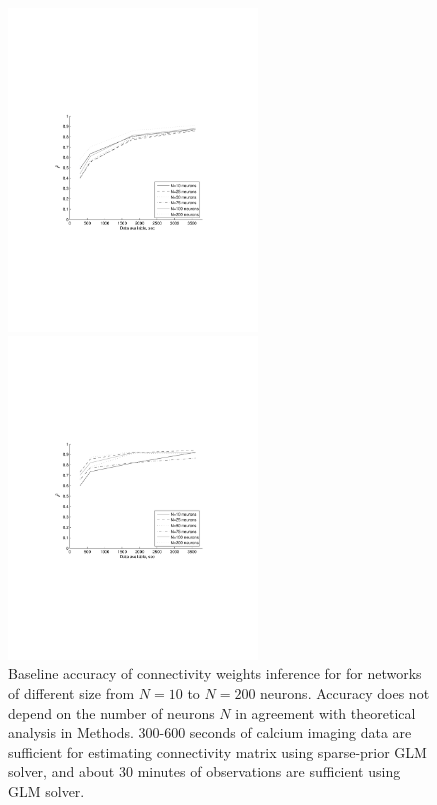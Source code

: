 \documentclass[amsmath,amssymb]{revtex4}
\begin{document}
\begin{figure}
\centering
\begin{minipage}[c]{0.45\hsize}
\includegraphics[width=250px]{Figure6a_perf_vs_N}
\end{minipage}
\begin{minipage}[c]{0.45\hsize}
\includegraphics[width=250px]{Figure6b_perf_vs_N_sparse}
\end{minipage}
\caption{Baseline accuracy of connectivity weights inference for
for networks of different size from $N=10$ to $N=200$ neurons.
Accuracy does not depend on the number of neurons $N$ in agreement with theoretical analysis in Methods. 300-600 seconds of calcium imaging data are sufficient for estimating connectivity matrix using sparse-prior GLM solver, and about 30 minutes of observations are sufficient using GLM solver.}
\label{fig:data-n}
\end{figure}
\end{document}
